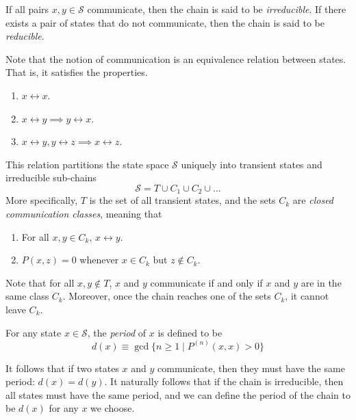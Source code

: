   \begin{definition}
    If all pairs $x, y \in \mathcal{S}$ communicate, then the chain is said to be \textit{irreducible}. If there exists a pair of states that do not communicate, then the chain is said to be \textit{reducible}. 
  \end{definition}

  Note that the notion of communication is an equivalence relation between states. That is, it satisfies the properties. 
  \begin{enumerate}
    \item $x \leftrightarrow x$.
    \item $x \leftrightarrow y \implies y \leftrightarrow x$.
    \item $x \leftrightarrow y, y \leftrightarrow z \implies x \leftrightarrow z$.
  \end{enumerate}
  This relation partitions the state space $\mathcal{S}$ uniquely into transient states and irreducible sub-chains
  \begin{equation}
    \mathcal{S} = T \cup C_1 \cup C_2 \cup ...
  \end{equation}
  More specifically, $T$ is the set of all transient states, and the sets $C_k$ are \textit{closed communication classes}, meaning that
  \begin{enumerate}
    \item For all $x, y \in C_k$, $x \leftrightarrow y$. 
    \item $P(x, z) = 0$ whenever $x \in C_k$ but $z \not\in C_k$. 
  \end{enumerate}
  Note that for all $x, y \not\in T$, $x$ and $y$ communicate if and only if $x$ and $y$ are in the same class $C_k$. Moreover, once the chain reaches one of the sets $C_k$, it cannot leave $C_k$. 

  \begin{definition}[Period]
    For any state $x \in \mathcal{S}$, the \textit{period} of $x$ is defined to be
    \begin{equation}
      d(x) \equiv \gcd \{n \geq 1 \; | \; P^{(n)} (x, x) > 0\}
    \end{equation}
  \end{definition}

  \begin{theorem}
    It follows that if two states $x$ and $y$ communicate, then they must have the same period: $d(x) = d(y)$. It naturally follows that if the chain is irreducible, then all states must have the same period, and we can define the period of the chain to be $d(x)$ for any $x$ we choose.
  \end{theorem}

